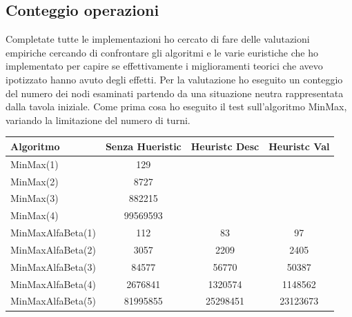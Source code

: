 \documentclass[paper=a4, fontsize=11pt]{scrartcl}	%
\numberwithin{equation}{section}															%
\numberwithin{figure}{section}																%
\numberwithin{table}{section}																%
\begin{document}
\subsection{Conteggio operazioni}
Completate tutte le implementazioni ho cercato di fare delle valutazioni empiriche cercando di confrontare gli algoritmi e le varie euristiche che ho implementato per capire se effettivamente i miglioramenti teorici che avevo ipotizzato hanno avuto degli effetti.
Per la valutazione ho eseguito un conteggio del numero dei nodi esaminati partendo da una situazione neutra rappresentata dalla tavola iniziale. Come prima cosa ho eseguito il test sull'algoritmo MinMax, variando la limitazione del numero di turni.
\begin{table} [h]
    \begin{tabular}{lccc}
        \hline
        Algoritmo & Senza Hueristic & Heuristc Desc\footnotemark[1] & Heuristc Val\footnotemark[2]\\ \hline
        MinMax(1) & 129 & ~ & ~ \\ 
        MinMax(2) & 8727 & ~ & ~ \\ 
        MinMax(3) & 882215 & ~ & ~ \\ 
        MinMax(4) & 99569593 & ~ & ~ \\ 
        MinMaxAlfaBeta(1) & 112 & 83 & 97 \\ 
        MinMaxAlfaBeta(2) & 3057 & 2209 & 2405 \\ 
        MinMaxAlfaBeta(3) & 84577 & 56770 & 50387 \\ 
        MinMaxAlfaBeta(4) & 2676841 & 1320574 & 1148562 \\ 
        MinMaxAlfaBeta(5) & 81995855 & 25298451 & 23123673\\ 
        \hline


    \end{tabular}
\end{table}
\end{document}
